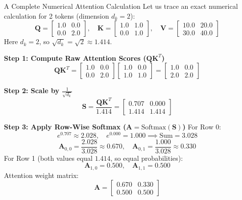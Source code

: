 \begin{mathbox}{A Complete Numerical Attention Calculation}
Let us trace an exact numerical calculation for 2 tokens (dimension $d_k = 2$):
\[
\mathbf{Q} = \begin{bmatrix} 1.0 & 0.0 \\ 0.0 & 2.0 \end{bmatrix}, \quad
\mathbf{K} = \begin{bmatrix} 1.0 & 1.0 \\ 0.0 & 1.0 \end{bmatrix}, \quad
\mathbf{V} = \begin{bmatrix} 10.0 & 20.0 \\ 30.0 & 40.0 \end{bmatrix}
\]
Here $d_k = 2$, so $\sqrt{d_k} = \sqrt{2} \approx 1.414$.

\textbf{Step 1: Compute Raw Attention Scores ($\mathbf{Q}\mathbf{K}^T$)}
\[
\mathbf{Q}\mathbf{K}^T = \begin{bmatrix} 1.0 & 0.0 \\ 0.0 & 2.0 \end{bmatrix} \begin{bmatrix} 1.0 & 0.0 \\ 1.0 & 1.0 \end{bmatrix} = \begin{bmatrix} 1.0 & 0.0 \\ 2.0 & 2.0 \end{bmatrix}
\]

\textbf{Step 2: Scale by $\frac{1}{\sqrt{d_k}}$}
\[
\mathbf{S} = \frac{\mathbf{Q}\mathbf{K}^T}{1.414} = \begin{bmatrix} 0.707 & 0.000 \\ 1.414 & 1.414 \end{bmatrix}
\]

\textbf{Step 3: Apply Row-Wise Softmax ($\mathbf{A} = \text{Softmax}(\mathbf{S})$)}
For Row 0:
\[
e^{0.707} \approx 2.028, \quad e^{0.000} = 1.000 \implies \text{Sum} = 3.028
\]
\[
\mathbf{A}_{0,0} = \frac{2.028}{3.028} \approx \mathbf{0.670}, \quad \mathbf{A}_{0,1} = \frac{1.000}{3.028} \approx \mathbf{0.330}
\]
For Row 1 (both values equal $1.414$, so equal probabilities):
\[
\mathbf{A}_{1,0} = \mathbf{0.500}, \quad \mathbf{A}_{1,1} = \mathbf{0.500}
\]
Attention weight matrix:
\[
\mathbf{A} = \begin{bmatrix} 0.670 & 0.330 \\ 0.500 & 0.500 \end{bmatrix}
\]


\end{mathbox}
